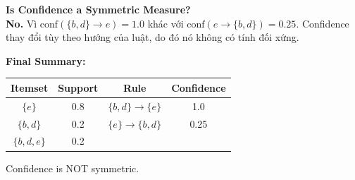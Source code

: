 \textbf{Is Confidence a Symmetric Measure?} \\
\textbf{No.} Vì $\text{conf}(\{b, d\} \rightarrow e) = 1.0$ khác với $\text{conf}(e \rightarrow \{b, d\}) = 0.25$. Confidence thay đổi tùy theo hướng của luật, do đó nó không có tính đối xứng.

\textbf{Final Summary:}
\begin{table}[H]
    \centering
    \begin{tabular}{|c|c|c|c|}
        \hline
        \textbf{Itemset} & \textbf{Support} & \textbf{Rule} & \textbf{Confidence} \\
        \hline
        $\{e\}$ & 0.8 & $\{b, d\} \rightarrow \{e\}$ & 1.0 \\ \hline
        $\{b, d\}$ & 0.2 & $\{e\} \rightarrow \{b, d\}$ & 0.25 \\ \hline
        $\{b, d, e\}$ & 0.2 & & \\ \hline
    \end{tabular}
\end{table}
Confidence is NOT symmetric.